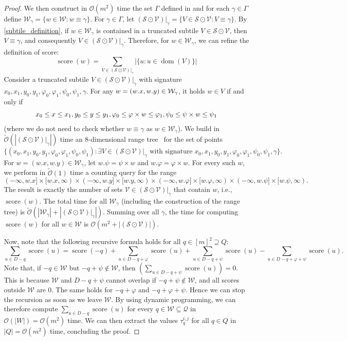 \documentclass[twoside,leqno]{article}
\renewcommand{\O}{\mathcal{O}}
\newcommand{\tO}{\tilde{\mathcal{O}}}
\newcommand{\Q}{\mathcal{Q}}
\renewcommand{\S}{\mathcal{S}}
\newcommand{\V}{\mathcal{V}}
\newcommand{\W}{\mathcal{W}}
\renewcommand{\phi}{\varphi}
\DeclareMathOperator*{\score}{score}
\DeclareMathOperator*{\dom}{dom}
\newcommand{\absolute}[1]{\left\lvert#1\right\rvert}
\begin{document}
\begin{proof}
We then construct in $\O(m^2)$ time the set $\Gamma$ defined in  and for each $\gamma \in \Gamma$ define $\W_\gamma = \{w \in \W : w \equiv \gamma\}$. For $\gamma \in \Gamma$, let $(\S \odot \V) |_\gamma = \{V \in \S \odot \V : V \equiv \gamma\}$. 
By \cref{subtile_definition}, if $w \in \W_\gamma$ is contained in a truncated subtile $V \in \S \odot \V$, then $V \equiv \gamma$, and consequently $V \in (\S \odot \V) |_\gamma$. Therefore, for $w \in \W_\gamma$, we can refine the definition of score:
%
$$\score(w) = \sum_{V \in (\S \odot \V) |_\gamma} \absolute{\{u : u \in \dom(V)\}}$$
%
Consider a truncated subtile $V \in (\S \odot \V) |_\gamma$ with signature $x_0, x_1, y_0, y_1, \phi_0, \phi_1, \psi_0, \psi_1, \gamma$. For any $w = (\x{w}, \y{w}) \in \W_\gamma$, it holds $w \in V$ if and only if
\begin{equation}
\label{eq:range}
x_0 \le x \le x_1, y_0 \le y \le y_1, \phi_0 \le \h{w} \le \phi_1, \psi_0 \le \s{w} \le \psi_1
\end{equation}
(where we do not need to check whether $w \equiv \gamma$ as $w \in \W_\gamma$). We build in $\tO(\absolute{(\S \odot \V) |_\gamma})$ time an $8$-dimensional range tree~\cite{BENTLEY1979244} for the set of points 
%
$$\{(x_0, x_1, y_0, y_1, \phi_0, \phi_1, \psi_0, \psi_1) : \exists V \in (\S \odot \V) |_\gamma\text{\ with signature\ } x_0, x_1, y_0, y_1, \phi_0, \phi_1, \psi_0, \psi_1, \gamma\}.$$
For $w = (w.x, w.y) \in \W_\gamma$, let $w.\psi = \psi \times w$ and $w.\phi = \phi \times w$. For every such $w$, we perform in $\tO(1)$ time a counting query for the range 
$$
(-\infty, w.x] \times [w.x, \infty) \times 
(-\infty, w.y] \times [w.y, \infty) \times
(-\infty, w.\phi] \times [w.\phi, \infty) \times
(-\infty, w.\psi] \times [w.\psi, \infty).
$$
The result is exactly the number of sets $\V \in (\S \odot \V) |_\gamma$ that contain $w$, i.e., $\score(w)$. The total time for all $\W_\gamma$ (including the construction of the range tree) is $\tO(\absolute{\W_\gamma} + \absolute{(\S \odot \V) |_\gamma})$. Summing over all $\gamma$, the time for computing $\score(w)$ for all $w \in \W$ is $\O(m^2 + \absolute{(\S \odot \V)})$.

Now, note that the following recursive formula holds for all $q \in [m]^2 \supseteq Q$:
%
$$\sum_{u \in D-q} \score(u) = \score(-q) + \sum_{u \in D-q+\phi} \score(u) + \sum_{u \in D-q+\psi} \score(u) -\sum_{u \in D-q+\phi+\psi} \score(u).$$
%
Note that, if $-q \in \W$ but $-q + \psi \notin \W$, then $(\sum_{u \in D-q+\psi} \score(u)) = 0$. This is because $\W$ and $D -q + \psi$ cannot overlap if $-q + \psi \notin \W$, and all scores outside $\W$ are $0$. The same holds for $-q + \phi$ and $-q + \phi + \psi$. Hence we can stop the recursion as soon as we leave $\W$. By using dynamic programming, we can therefore compute $\sum_{u \in D-q} \score(u)$ for every $q \in\W \subseteq \Q$ in $\O(\absolute{W}) = \O(m^2)$ time. 
We can then extract the values $\tau^{i,j}_q$ for all $q \in Q$ in $\absolute{Q} = \O(m^2)$ time, concluding the proof. 
\end{proof}
	
\end{document}
